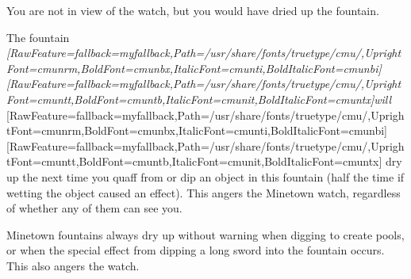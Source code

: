 \begin{myquote}
\item{}You are not in view of the watch, but you would have dried up the fountain.
\end{myquote}

The fountain {\itshape \allowbreak{}\setmainfont{cmunti.ttf}[RawFeature={fallback=myfallback},Path=/usr/share/fonts/truetype/cmu/,UprightFont=cmunrm,BoldFont=cmunbx,ItalicFont=cmunti,BoldItalicFont=cmunbi]\setmonofont{cmunti.ttf}[RawFeature={fallback=myfallback},Path=/usr/share/fonts/truetype/cmu/,UprightFont=cmuntt,BoldFont=cmuntb,ItalicFont=cmunit,BoldItalicFont=cmuntx]\itshape will}{$\text{ }$}\allowbreak{}\setmainfont{cmunrm.ttf}[RawFeature={fallback=myfallback},Path=/usr/share/fonts/truetype/cmu/,UprightFont=cmunrm,BoldFont=cmunbx,ItalicFont=cmunti,BoldItalicFont=cmunbi]\setmonofont{cmunrm.ttf}[RawFeature={fallback=myfallback},Path=/usr/share/fonts/truetype/cmu/,UprightFont=cmuntt,BoldFont=cmuntb,ItalicFont=cmunit,BoldItalicFont=cmuntx] dry up the next time you quaff from or dip an object in this fountain (half the time if wetting the object caused an effect). This angers the Minetown watch, regardless of whether any of them can see you.


Minetown fountains always dry up without warning when digging to create pools, or when the special effect from dipping a long sword into the fountain occurs. This also angers the watch.



